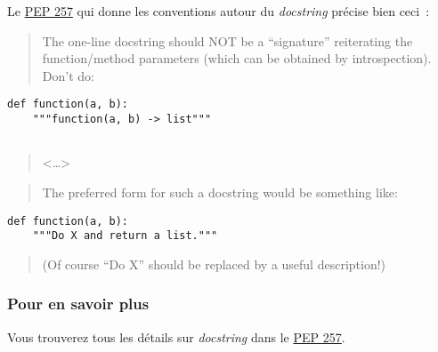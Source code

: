 Le \href{http://legacy.python.org/dev/peps/pep-0257/}{PEP 257} qui donne
les conventions autour du \emph{docstring} précise bien ceci~:

    \begin{quote}
The one-line docstring should NOT be a ``signature'' reiterating the
function/method parameters (which can be obtained by introspection).
Don't do:
\end{quote}

\begin{verbatim}
def function(a, b):
    """function(a, b) -> list"""
 
\end{verbatim}

\begin{quote}
\textless{}\ldots{}\textgreater{}
\end{quote}

\begin{quote}
The preferred form for such a docstring would be something like:
\end{quote}

\begin{verbatim}
def function(a, b):
    """Do X and return a list."""
\end{verbatim}

\begin{quote}
(Of course ``Do X'' should be replaced by a useful description!)
\end{quote}

    \hypertarget{pour-en-savoir-plus}{%
\subsubsection{Pour en savoir plus}\label{pour-en-savoir-plus}}

    Vous trouverez tous les détails sur \emph{docstring} dans le
\href{http://legacy.python.org/dev/peps/pep-0257/}{PEP 257}.


    
    
    
